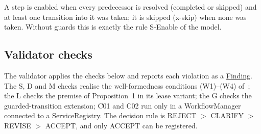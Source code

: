 \documentclass[a4paper]{arrowhead}
\newcommand{\mref}[1]{{\textcolor{ArrowheadPurple}{\hyperref[sec:model:#1]{#1}}}}
\begin{document}
A step is enabled when every predecessor is resolved (completed or skipped) and at least one transition into it was
taken; it is skipped (x-skip) when none was taken. Without guards this is exactly the rule S-Enable of the model.


\subsection{Validator checks}
\label{sec:codes}
The validator applies the checks below and reports each violation as a \mref{Finding}. The S, D and M checks realise the
well-formedness conditions (W1)--(W4) of~\cite{varga2026}; the L checks the premise of Proposition~1 in its lease
variant; the G checks the guarded-transition extension; C01 and C02 run only in a WorkflowManager connected to a
ServiceRegistry. The decision rule is REJECT $>$ CLARIFY $>$ REVISE $>$ ACCEPT, and only ACCEPT can be registered.
\end{document}
